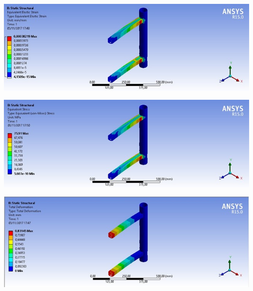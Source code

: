     \begin{center}
    	\includegraphics[scale=0.7]{figuras/sim_estatica_3}
        \label{sim_estatica_3}
    \end{center}
    
    \begin{center}
    	\includegraphics[scale=0.7]{figuras/stress_3}
        \label{stress_3}
    \end{center}
    
    \begin{center}
    	\includegraphics[scale=0.7]{figuras/deformacao_1}
        \label{deformacao_1}
    \end{center}

